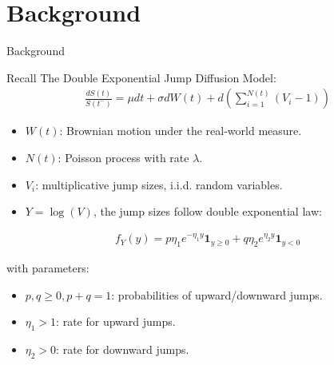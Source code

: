 \documentclass{beamer}
\begin{document}
\section{Background}
\begin{frame}{Background}

    {\footnotesize \footnotesize
    \par Recall The Double Exponential Jump Diffusion Model:
    \begin{align*}
        \frac{dS(t)}{S(t^{-})} = \mu dt + \sigma dW(t) + d\left(\sum_{i=1}^{N(t)} (V_i - 1)\right)
    \end{align*}
    \par\begin{itemize}
    \item \( W(t) \): Brownian motion under the real-world measure.
    \item \( N(t) \): Poisson process with rate \(\lambda\).
    \item \( V_i \): multiplicative jump sizes, i.i.d. random variables.
    \item \( Y = \log(V) \), the jump sizes follow double exponential law:
    \end{itemize}   
    \begin{align*}
        f_Y(y) = p \eta_1 e^{-\eta_1 y} \mathbf{1}_{y \geq 0} + q \eta_2 e^{\eta_2 y} \mathbf{1}_{y < 0}
    \end{align*}
    \par with parameters:
    \begin{itemize}
        \item \( p, q \geq 0, p + q = 1 \): probabilities of upward/downward jumps.
        \item \(\eta_1 > 1\): rate for upward jumps.
        \item \(\eta_2 > 0\): rate for downward jumps.
    \end{itemize}
    }
    
\end{frame}
\end{document}
